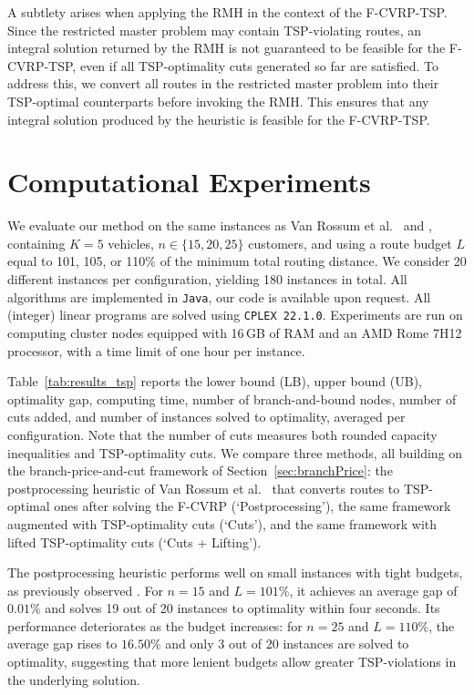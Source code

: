 \documentclass[a4paper,fleqn]{cas-dc}%
\newcommand{\CitetVR}[1]{Van Rossum et al.\ \cite{#1}}
\begin{document}
A subtlety arises when applying the RMH in the context of the F-CVRP-TSP. Since the restricted master problem may contain TSP-violating routes, an integral solution returned by the RMH is not guaranteed to be feasible for the F-CVRP-TSP, even if all TSP-optimality cuts generated so far are satisfied. To address this, we convert all routes in the restricted master problem into their TSP-optimal counterparts before invoking the RMH. This ensures that any integral solution produced by the heuristic is feasible for the F-CVRP-TSP.

\section{Computational Experiments}
\label{sec:experiments}

We evaluate our method on the same instances as \CitetVR{rossum2025efficient} and \citet{ljubic2026fairvehicle}, containing $K=5$ vehicles, $n \in \{15, 20, 25\}$ customers, and using a route budget $L$ equal to 101, 105, or 110\% of the minimum total routing distance. We consider 20 different instances per configuration, yielding 180 instances in total. All algorithms are implemented in \texttt{Java}, our code is available upon request. All (integer) linear programs are solved using \texttt{CPLEX 22.1.0}. Experiments are run on computing cluster nodes equipped with 16\,GB of RAM and an AMD Rome 7H12 processor, with a time limit of one hour per instance.



Table~\ref{tab:results_tsp} reports the lower bound (LB), upper bound (UB), optimality gap, computing time, number of branch-and-bound nodes, number of cuts added, and number of instances solved to optimality, averaged per configuration. Note that the number of cuts measures both rounded capacity inequalities and TSP-optimality cuts. We compare three methods, all building on the branch-price-and-cut framework of Section~\ref{sec:branchPrice}: the postprocessing heuristic of \CitetVR{rossum2025efficient} that converts routes to TSP-optimal ones after solving the F-CVRP (`Postprocessing'), the same framework augmented with TSP-optimality cuts (`Cuts'), and the same framework with lifted TSP-optimality cuts (`Cuts + Lifting').

The postprocessing heuristic performs well on small instances with tight budgets, as previously observed \citep{rossum2025efficient}. For $n = 15$ and $L = 101\%$, it achieves an average gap of $0.01\%$ and solves 19 out of 20 instances to optimality within four seconds. Its performance deteriorates as the budget increases: for $n = 25$ and $L = 110\%$, the average gap rises to $16.50\%$ and only 3 out of 20 instances are solved to optimality, suggesting that more lenient budgets allow greater TSP-violations in the underlying solution.
\end{document}

